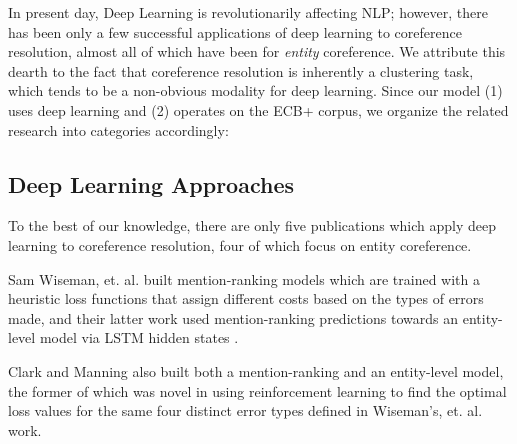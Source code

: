 \documentclass[11pt,a4paper]{article}
\begin{document}

In present day, Deep Learning is revolutionarily affecting NLP; however, there has been only a few successful applications of deep learning to coreference resolution, almost all of which have been for \textit{entity} coreference.  We attribute this dearth to the fact that coreference resolution is inherently a clustering task, which tends to be a non-obvious modality for deep learning.  Since our model (1) uses deep learning and (2) operates on the ECB+ corpus, we organize the related research into categories accordingly:

\subsection{Deep Learning Approaches}
To the best of our knowledge, there are only five publications which apply deep learning to coreference resolution, four of which focus on entity coreference.

Sam Wiseman, et. al.  built mention-ranking models which are trained with a heuristic loss functions that assign different costs based on the types of errors made, and their latter work used mention-ranking predictions towards an entity-level model via LSTM hidden states \cite{Hochreiter:1997:LSM:1246443.1246450}.

Clark and Manning  also built both a mention-ranking and an entity-level model, the former of which was novel in using reinforcement learning to find the optimal loss values for the same four distinct error types defined in Wiseman's, et. al.  work.
\end{document}
